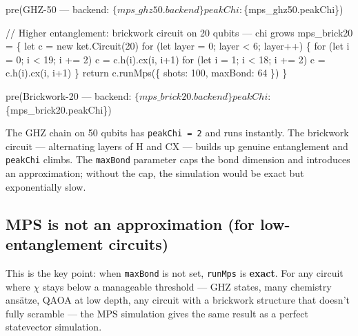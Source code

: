 \documentclass[
  11pt,
  letterpaper,
  oneside]{scrbook}
\newenvironment{Shaded}{\begin{snugshade}}{\end{snugshade}}
\newcommand{\NormalTok}[1]{\textcolor[rgb]{0.00,0.23,0.31}{#1}}
\begin{document}
\begin{Shaded}
\begin{Highlighting}[]
\NormalTok{pre(\textasciigrave{}GHZ{-}50 — backend: $\{mps\_ghz50.backend\}   peakChi: $\{mps\_ghz50.peakChi\}\textasciigrave{})}
\end{Highlighting}
\end{Shaded}

\begin{Shaded}
\begin{Highlighting}[]
\NormalTok{// Higher entanglement: brickwork circuit on 20 qubits — chi grows}
\NormalTok{mps\_brick20 = \{}
\NormalTok{  let c = new ket.Circuit(20)}
\NormalTok{  for (let layer = 0; layer \textless{} 6; layer++) \{}
\NormalTok{    for (let i = 0; i \textless{} 19; i += 2) c = c.h(i).cx(i, i+1)}
\NormalTok{    for (let i = 1; i \textless{} 18; i += 2) c = c.h(i).cx(i, i+1)}
\NormalTok{  \}}
\NormalTok{  return c.runMps(\{ shots: 100, maxBond: 64 \})}
\NormalTok{\}}
\end{Highlighting}
\end{Shaded}

\begin{Shaded}
\begin{Highlighting}[]
\NormalTok{pre(\textasciigrave{}Brickwork{-}20 — backend: $\{mps\_brick20.backend\}   peakChi: $\{mps\_brick20.peakChi\}\textasciigrave{})}
\end{Highlighting}
\end{Shaded}

The GHZ chain on 50 qubits has \texttt{peakChi\ =\ 2} and runs
instantly. The brickwork circuit --- alternating layers of H and CX ---
builds up genuine entanglement and \texttt{peakChi} climbs. The
\texttt{maxBond} parameter caps the bond dimension and introduces an
approximation; without the cap, the simulation would be exact but
exponentially slow.

\subsection{MPS is not an approximation (for low-entanglement
circuits)}\label{mps-is-not-an-approximation-for-low-entanglement-circuits}

This is the key point: when \texttt{maxBond} is not set, \texttt{runMps}
is \textbf{exact}. For any circuit where \(\chi\) stays below a
manageable threshold --- GHZ states, many chemistry ansätze, QAOA at low
depth, any circuit with a brickwork structure that doesn't fully
scramble --- the MPS simulation gives the same result as a perfect
statevector simulation.
\end{document}
